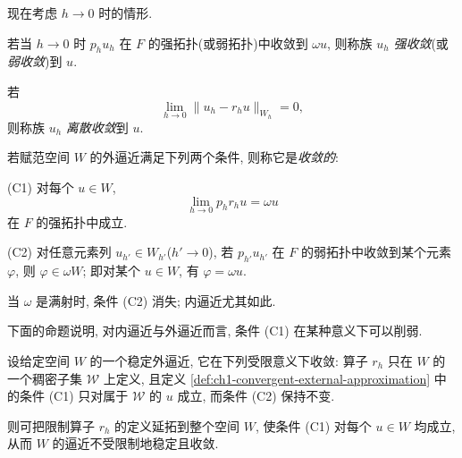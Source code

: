 现在考虑 $h\to0$ 时的情形.

\begin{Definition}
\label{def:ch1-strong-weak-discrete-convergence}
若当 $h\to0$ 时 $p_hu_h$ 在 $F$ 的强拓扑(或弱拓扑)中收敛到 $\omega u$, 则称族 $u_h$ \emph{强收敛}(或\emph{弱收敛})到 $u$.

若
\[
\lim_{h\to0}\|u_h-r_hu\|_{W_h}=0,
\]
则称族 $u_h$ \emph{离散收敛}到 $u$.
\end{Definition}

\begin{Definition}
\label{def:ch1-convergent-external-approximation}
若赋范空间 $W$ 的外逼近满足下列两个条件, 则称它是\emph{收敛的}:

(C1) 对每个 $u\in W$,
\[
\lim_{h\to0}p_hr_hu=\omega u
\]
在 $F$ 的强拓扑中成立.

(C2) 对任意元素列 $u_{h'}\in W_{h'}$($h'\to0$), 若 $p_{h'}u_{h'}$ 在 $F$ 的弱拓扑中收敛到某个元素 $\varphi$, 则 $\varphi\in\omega W$; 即对某个 $u\in W$, 有 $\varphi=\omega u$.
\end{Definition}

\begin{Remark}
\label{rem:ch1-convergence-condition-c2}
当 $\omega$ 是满射时, 条件 (C2) 消失; 内逼近尤其如此.
\end{Remark}

下面的命题说明, 对内逼近与外逼近而言, 条件 (C1) 在某种意义下可以削弱.

\begin{Proposition}
\label{prop:ch1-extend-restriction-operators}
设给定空间 $W$ 的一个稳定外逼近, 它在下列受限意义下收敛: 算子 $r_h$ 只在 $W$ 的一个稠密子集 $\mathcal W$ 上定义, 且定义 \ref{def:ch1-convergent-external-approximation} 中的条件 (C1) 只对属于 $\mathcal W$ 的 $u$ 成立, 而条件 (C2) 保持不变.

则可把限制算子 $r_h$ 的定义延拓到整个空间 $W$, 使条件 (C1) 对每个 $u\in W$ 均成立, 从而 $W$ 的逼近不受限制地稳定且收敛.
\end{Proposition}

